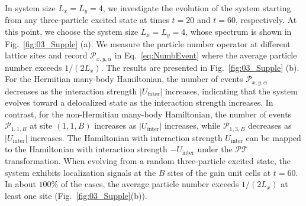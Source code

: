 \documentclass[longbibliography, aps, prx, amsmath, amssymb, amsfonts, twocolumn,superscriptaddress, footinbib]{revtex4-1}
\begin{document}
	In system size $L_x = L_y = 4$, we investigate the evolution of the system starting from any three-particle excited state at times $t = 20$ and $t = 60$, respectively. 
	At this point, we choose the system size $L_x=L_y=4$, whose spectrum is shown in Fig.~\ref{fig:03_Supple} (a). 
	We measure the particle number operator at different lattice sites and record $\mathcal{P}_{x,y,\alpha}$ in Eq.~\eqref{eq:NumbEvent} where the average particle number exceeds $1/(2L_x)$. The results are presented in Fig.~\ref{fig:03_Supple} (b).
	For the Hermitian many-body Hamiltonian, the number of events $\mathcal{P}_{x,y,\alpha}$ decreases as the interaction strength $\vert U_{\text{inter}}\vert $ increases, indicating that the system evolves toward a delocalized state as the interaction strength increases. 
	In contrast, for the non-Hermitian many-body Hamiltonian, the number of events $\mathcal{P}_{1,1,B}$ at site $(1,1,B)$ increases as $\vert U_{\text{inter}}\vert$ increases, while $\mathcal{P}_{1,3,B}$ decreases as $\vert U_{\text{inter}}\vert$ increases. 
	The Hamiltonian with interaction strength $U_{\text{inter}}$ can be mapped to the Hamiltonian with interaction strength $-U_{\text{inter}}$ under the $\mathcal{PT}$ transformation.
	When evolving from a random three-particle excited state, the system exhibits localization signals at the $B$ sites of the gain unit cells at $t=60$.
	In about $100\%$ of the cases, the average particle number exceeds $1/(2L_x)$ at least one site (Fig.~\ref{fig:03_Supple}(b)).
\end{document}
